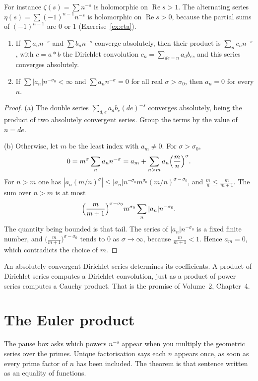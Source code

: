 For instance $\zeta(s)=\sum n^{-s}$ is holomorphic on $\operatorname{Re}s>1$. The alternating series $\eta(s)=\sum(-1)^{n-1}n^{-s}$ is holomorphic on $\operatorname{Re}s>0$, because the partial sums of $(-1)^{n-1}$ are $0$ or $1$ (Exercise~\ref{ex:eta}).

\begin{proposition}\label{prop:dirmult}
\begin{enumerate}[label=(\alph*)]
\item If $\sum a_nn^{-s}$ and $\sum b_nn^{-s}$ converge absolutely, then their product is $\sum_nc_nn^{-s}$, with $c=a*b$ the Dirichlet convolution
$c_n=\sum_{de=n}a_db_e$, and this series converges absolutely.
\item If $\sum|a_n|n^{-\sigma_0}<\infty$ and $\sum a_nn^{-\sigma}=0$ for all real $\sigma>\sigma_0$, then $a_n=0$ for every $n$.
\end{enumerate}
\end{proposition}
\begin{proof}
(a) The double series $\sum_{d,e}a_db_e(de)^{-s}$ converges absolutely, being the product of two absolutely convergent series. Group the terms by the value of $n=de$.

(b) Otherwise, let $m$ be the least index with $a_m\ne0$. For $\sigma>\sigma_0$,
\[
0=m^\sigma\sum_na_nn^{-\sigma}=a_m+\sum_{n>m}a_n\Bigl(\frac mn\Bigr)^\sigma.
\]
For $n>m$ one has $|a_n(m/n)^\sigma|\le|a_n|n^{-\sigma_0}m^{\sigma_0}(m/n)^{\sigma-\sigma_0}$, and $\frac mn\le\frac m{m+1}$. The sum over $n>m$ is at most
\[
\Bigl(\frac m{m+1}\Bigr)^{\sigma-\sigma_0}m^{\sigma_0}\sum_n|a_n|n^{-\sigma_0}.
\]
The quantity being bounded is that tail. The series of $|a_n|n^{-\sigma_0}$ is a fixed finite number, and $\bigl(\frac m{m+1}\bigr)^{\sigma-\sigma_0}$ tends to $0$ as $\sigma\to\infty$, because $\frac m{m+1}<1$. Hence $a_m=0$, which contradicts the choice of $m$.
\end{proof}

An absolutely convergent Dirichlet series determines its coefficients. A product of Dirichlet series computes a Dirichlet convolution, just as a product of power series computes a Cauchy product. That is the promise of Volume~2, Chapter~4.

\section{The Euler product}

The pause box asks which powers $n^{-s}$ appear when you multiply the geometric series over the primes. Unique factorisation says each $n$ appears once, as soon as every prime factor of $n$ has been included. The theorem is that sentence written as an equality of functions.


